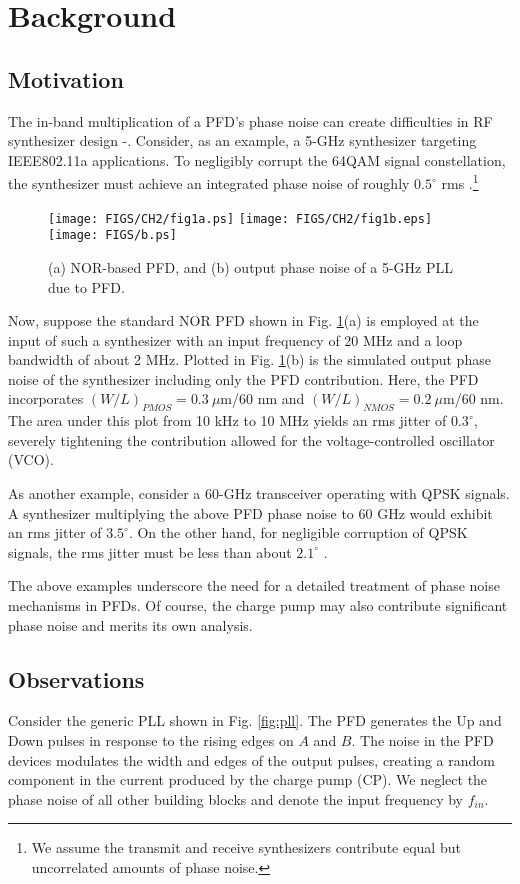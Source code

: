 \section{Background}
\subsection{Motivation}
The in-band multiplication of a PFD's phase noise can create difficulties in RF synthesizer design \cite{Tsutsumi}-\cite{Wilson}. Consider, as an example, a
5-GHz synthesizer targeting IEEE802.11a applications. To negligibly corrupt the 64QAM signal constellation, the synthesizer
must achieve an integrated phase noise of roughly $0.5^\circ$ rms \cite{Chen}.\footnote{We assume the transmit and
receive synthesizers contribute equal but uncorrelated amounts of phase noise.}
\begin{figure}[htb!]
\centering
\texttt{[image: FIGS/CH2/fig1a.ps]}
\texttt{[image: FIGS/CH2/fig1b.eps]}
\texttt{[image: FIGS/b.ps]}
\caption{(a) NOR-based PFD, and (b) output phase noise of a 5-GHz PLL due to PFD.}
\label{fig:pfdnor}
\end{figure}
Now, suppose the standard NOR PFD shown in Fig. \ref{fig:pfdnor}(a) is employed at the input of such a synthesizer with an input
frequency of 20 MHz and a loop bandwidth of about 2 MHz. Plotted in Fig. \ref{fig:pfdnor}(b) is the simulated output phase noise of
the synthesizer including only the PFD contribution. Here, the PFD incorporates $(W/L)_{PMOS}=0.3\ \mu$m/60 nm and
$(W/L)_{NMOS}=0.2\ \mu$m/60 nm. The area under this plot from 10 kHz to 10 MHz yields an rms jitter of $0.3^\circ$, severely tightening the
contribution allowed for the voltage-controlled oscillator (VCO).

As another example, consider a 60-GHz transceiver operating with QPSK signals. A synthesizer multiplying the above PFD phase
noise to 60 GHz would exhibit an rms jitter of $3.5^\circ$. On the other hand, for negligible corruption of QPSK signals, the rms jitter
must be less than about $2.1^\circ$ \cite{Chen}.

The above examples underscore the need for a detailed treatment of phase noise mechanisms in PFDs. Of course, the
charge pump may also contribute significant phase noise and merits its own analysis.

\subsection{Observations}
Consider the generic PLL shown in Fig. \ref{fig:pll}. The PFD generates the Up and Down pulses in response to the rising edges on $A$ and $B$. The
noise in the PFD devices modulates the width and edges of the output pulses, creating a random component in the current produced by the charge
pump (CP). We neglect the phase noise of all other building blocks and denote the input frequency by $f_{in}$. 

